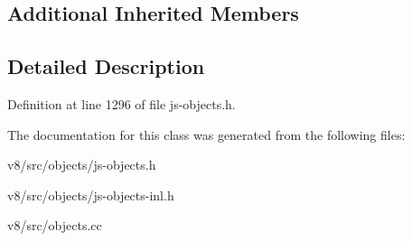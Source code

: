 \subsection*{Additional Inherited Members}


\subsection{Detailed Description}


Definition at line 1296 of file js-\/objects.\+h.



The documentation for this class was generated from the following files\+:\begin{DoxyCompactItemize}
\item 
v8/src/objects/js-\/objects.\+h\item 
v8/src/objects/js-\/objects-\/inl.\+h\item 
v8/src/objects.\+cc\end{DoxyCompactItemize}
